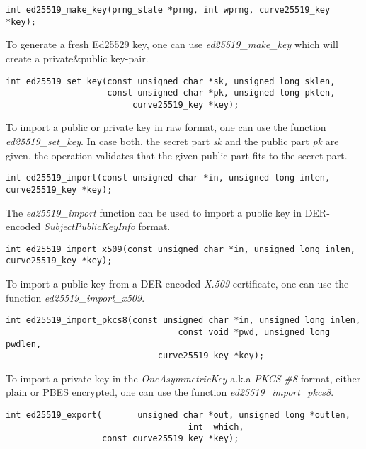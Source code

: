 \documentclass[synpaper]{book}
\begin{document}
\begin{verbatim}
int ed25519_make_key(prng_state *prng, int wprng, curve25519_key *key);
\end{verbatim}

To generate a fresh Ed25529 key, one can use \textit{ed25519\_make\_key} which will create a private\&public key-pair.

\begin{verbatim}
int ed25519_set_key(const unsigned char *sk, unsigned long sklen,
                    const unsigned char *pk, unsigned long pklen,
                         curve25519_key *key);
\end{verbatim}

To import a public or private key in raw format, one can use the function \textit{ed25519\_set\_key}.
In case both, the secret part \textit{sk} and the public part \textit{pk} are given, the operation validates that the given 
public part fits to the secret part.

\begin{verbatim}
int ed25519_import(const unsigned char *in, unsigned long inlen, curve25519_key *key);
\end{verbatim}

The \textit{ed25519\_import} function can be used to import a public key in DER-encoded \textit{SubjectPublicKeyInfo} format.

\begin{verbatim}
int ed25519_import_x509(const unsigned char *in, unsigned long inlen, curve25519_key *key);
\end{verbatim}

To import a public key from a DER-encoded \textit{X.509} certificate, one can use the function \textit{ed25519\_import\_x509}.

\begin{verbatim}
int ed25519_import_pkcs8(const unsigned char *in, unsigned long inlen,
                                  const void *pwd, unsigned long pwdlen,
                              curve25519_key *key);
\end{verbatim}

To import a private key in the \textit{OneAsymmetricKey} a.k.a \textit{PKCS \#8} format, either plain or PBES encrypted,
one can use the function \textit{ed25519\_import\_pkcs8}.

\begin{verbatim}
int ed25519_export(       unsigned char *out, unsigned long *outlen,
                                    int  which,
                   const curve25519_key *key);
\end{verbatim}
\end{document}

